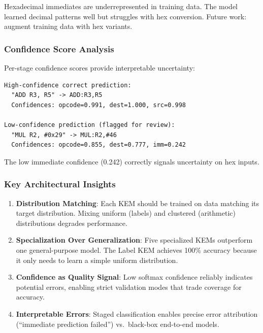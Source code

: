 \documentclass[11pt]{article}
\begin{document}
Hexadecimal immediates are underrepresented in training data. The model learned decimal patterns well but struggles with hex conversion. Future work: augment training data with hex variants.

\subsubsection{Confidence Score Analysis}

Per-stage confidence scores provide interpretable uncertainty:

\begin{lstlisting}
High-confidence correct prediction:
  "ADD R3, R5" -> ADD:R3,R5
  Confidences: opcode=0.991, dest=1.000, src=0.998

Low-confidence prediction (flagged for review):
  "MUL R2, #0x29" -> MUL:R2,#46
  Confidences: opcode=0.855, dest=0.777, imm=0.242
\end{lstlisting}

The low immediate confidence (0.242) correctly signals uncertainty on hex inputs.

\subsubsection{Key Architectural Insights}

\begin{enumerate}
    \item \textbf{Distribution Matching}: Each KEM should be trained on data matching its target distribution. Mixing uniform (labels) and clustered (arithmetic) distributions degrades performance.

    \item \textbf{Specialization Over Generalization}: Five specialized KEMs outperform one general-purpose model. The Label KEM achieves 100\% accuracy because it only needs to learn a simple uniform distribution.

    \item \textbf{Confidence as Quality Signal}: Low softmax confidence reliably indicates potential errors, enabling strict validation modes that trade coverage for accuracy.

    \item \textbf{Interpretable Errors}: Staged classification enables precise error attribution (``immediate prediction failed'') vs.\ black-box end-to-end models.
\end{enumerate}

\end{document}
